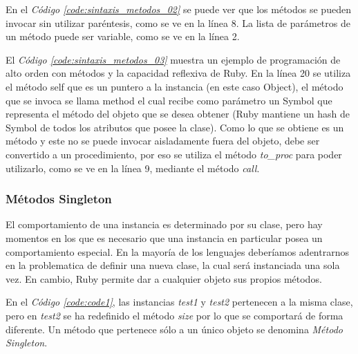 \documentclass{article}
\newcommand{\refcode}[1]{\textit{Código \ref{#1}}}
\begin{document}

\bigskip\bigskip

	En el \refcode{code:sintaxis_metodos_02} se puede ver que los métodos se pueden invocar sin utilizar paréntesis, como se ve en la línea 8. La lista de parámetros de un método puede ser variable, como se ve en la línea 2.


\bigskip\bigskip

	El \refcode{code:sintaxis_metodos_03} muestra un ejemplo de programación de alto orden con métodos y la capacidad reflexiva de Ruby. En la línea 20 se utiliza el método self que es un puntero a la instancia (en este caso Object), el método que se invoca se llama method el cual recibe como parámetro un Symbol que representa el método del objeto que se desea obtener (Ruby mantiene un hash de Symbol de todos los atributos que posee la clase). Como lo que se obtiene es un método y este no se puede invocar aisladamente fuera del objeto, debe ser convertido a un procedimiento, por eso se utiliza el método \textit{to\_proc} para poder utilizarlo, como se ve en la línea 9, mediante el método \textit{call}.


 
\bigskip



\subsubsection{Métodos Singleton}

	El comportamiento de una instancia es determinado por su clase, pero hay momentos en los que es necesario que una instancia en particular posea un comportamiento especial. En la mayoría de los lenguajes deberíamos adentrarnos en la problematica de definir una nueva clase, la cual será instanciada una sola vez. En cambio, Ruby permite dar a cualquier objeto sus propios métodos.

 
\bigskip

	En el \refcode{code:code1}, las instancias \textit{test1} y \textit{test2} pertenecen a la misma clase, pero en \textit{test2} se ha redefinido el método \textit{size} por lo que se comportará de forma diferente. Un método que pertenece sólo a un único objeto se denomina \textit{Método Singleton}.
\bigskip
\end{document}
